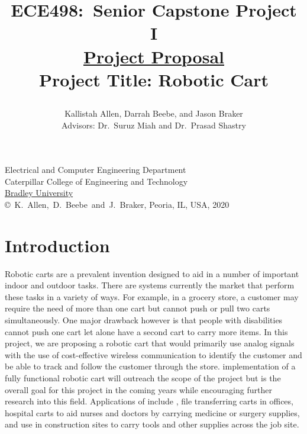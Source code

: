 \documentclass[letterpaper,12pt]{article}   %
\title{ECE498:~Senior Capstone Project I\\\textbf{\underline{Project Proposal}}\\
\vspace{0.5in}
Project Title: Robotic Cart
\vspace{1.0in}
\author{Kallistah Allen, Darrah Beebe, and Jason Braker\\ Advisors: Dr.~Suruz Miah and Dr.~Prasad Shastry}
}
\date{}  %
\begin{document}
\begin{titlepage}
 \maketitle

\vspace*{4.0cm}
\begin{center}
\normalsize
Electrical and Computer Engineering Department\\
Caterpillar College of Engineering and Technology\\
\href{http://www.bradley.edu/}{Bradley University}\\

\vspace*{6.0cm}
\copyright~K.~Allen,~D.~Beebe~and~J.~Braker, Peoria, IL, USA, 2020\\

\end{center}
\thispagestyle{empty}

\end{titlepage} 
\newpage
\renewcommand{\contentsname}{Table of Contents}
\tableofcontents
\newpage

\section{Introduction}
Robotic carts are a prevalent invention designed to aid  in a number of important indoor and outdoor tasks. There are
 systems currently   the market that
perform these tasks in a variety of ways. For example, in a grocery store, a customer may require the need of more than
one cart but cannot push or pull two carts simultaneously. One major
drawback\add{,} 
however\add{,} is that people with disabilities cannot push one cart let alone have a
second cart to carry more items.  In this project, we are proposing a robotic
cart that would primarily use analog signals with the use of cost-effective
wireless communication to identify the customer and be able to track and follow
the customer through the store.  implementation of 
a fully functional robotic cart will outreach the scope of the project but is the overall goal for
this project in the coming years while encouraging further research into this
field. Applications of  include
 , file
transferring carts in offices, hospital carts to aid nurses and doctors by
carrying medicine or surgery supplies, and use in construction sites to carry
tools and other supplies across the job site.
\end{document}
